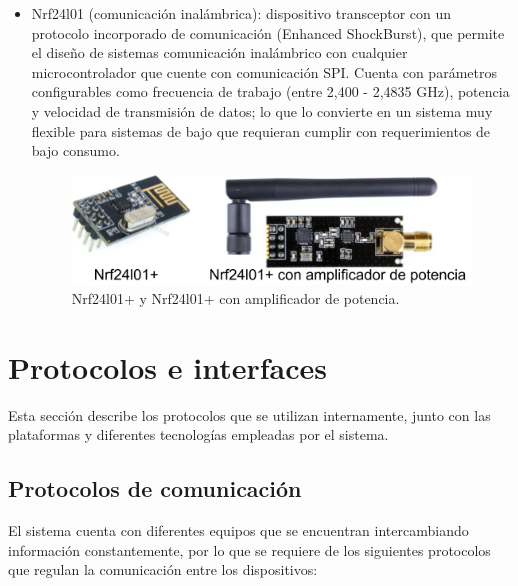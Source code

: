 \begin{itemize}
\item Nrf24l01 (comunicación inalámbrica): dispositivo transceptor \cite{rf24} con un protocolo incorporado de comunicación (Enhanced ShockBurst), que permite el diseño de sistemas comunicación inalámbrico con cualquier microcontrolador que cuente con comunicación SPI. Cuenta con parámetros configurables como frecuencia de trabajo (entre 2,400 - 2,4835 GHz), potencia y velocidad de transmisión de datos; lo que lo convierte en un sistema muy flexible para sistemas de bajo que requieran cumplir con requerimientos de bajo consumo.

\begin{figure}[h]
	\centering
	\includegraphics[scale=.65]{./Figures/Capitulo2/Figura_D.png}
	\caption{Nrf24l01+ y Nrf24l01+ con amplificador de potencia.}
	\label{fig:figura_d1}
\end{figure}
\end{itemize}

\section{Protocolos e interfaces}

Esta sección describe los protocolos que se utilizan internamente, junto con las plataformas y diferentes tecnologías empleadas por el sistema.      

\subsection{Protocolos de comunicación }
El sistema cuenta con diferentes equipos que se encuentran intercambiando información constantemente, por lo que se requiere de los siguientes protocolos que regulan la comunicación entre los dispositivos:

